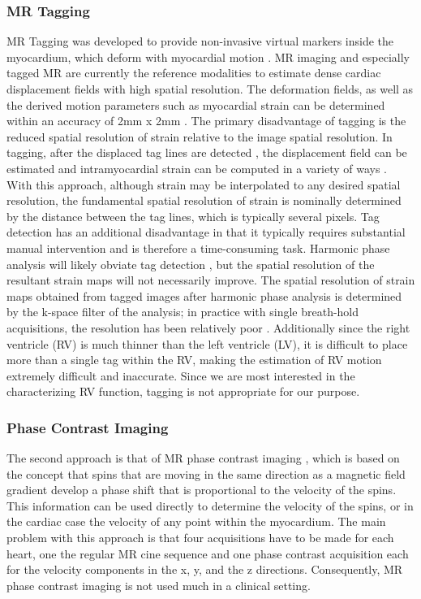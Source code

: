 \subsubsection{MR Tagging}
MR Tagging was developed to provide non-invasive virtual markers inside the myocardium, which deform with myocardial motion \cite{ mrtag}. MR imaging and especially tagged MR are currently the reference modalities to estimate dense cardiac displacement fields with high spatial resolution. The deformation fields, as well as the derived motion parameters such as myocardial strain can be determined within an accuracy of 2mm x 2mm \cite{ Shi99, chenBook}. The primary disadvantage of tagging is the reduced spatial resolution of strain relative to the image spatial resolution. In tagging, after the displaced tag lines are detected \cite{ guttman94}, the displacement field can be estimated and intramyocardial strain can be computed in a variety of ways \cite{ mrtag}. With this approach, although strain may be interpolated to any desired spatial resolution, the fundamental spatial resolution of strain is nominally determined by the distance between the tag lines, which is typically several pixels. Tag detection has an additional disadvantage in that it typically requires substantial manual intervention and is therefore a time-consuming task. Harmonic phase analysis will likely obviate tag detection \cite{osman1999cmt}, but the spatial resolution of the resultant strain maps will not necessarily improve. The spatial resolution of strain maps obtained from tagged images after harmonic phase analysis is determined by the k-space filter of the analysis; in practice with single breath-hold acquisitions, the resolution has been relatively poor \cite{ garot00}. Additionally since the right ventricle (RV) is much thinner than the left ventricle (LV), it is difficult to place more than a single tag within the RV, making the estimation of RV motion extremely difficult and inaccurate. Since we are most interested in the characterizing RV function, tagging is not appropriate for our purpose.

\subsubsection{Phase Contrast Imaging}
The second approach is that of MR phase contrast imaging \cite{ mrphase}, which is based on the concept that spins that are moving in the same direction as a magnetic field gradient develop a phase shift that is proportional to the velocity of the spins. This information can be used directly to determine the velocity of the spins, or in the cardiac case the velocity of any point within the myocardium. The main problem with this approach is that four acquisitions have to be made for each heart, one the regular MR cine sequence and one phase contrast acquisition each for the velocity components in the x, y, and the z directions. Consequently, MR phase contrast imaging is not used much in a clinical setting. 

